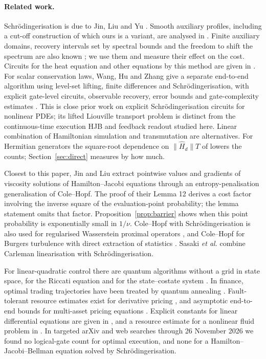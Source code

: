 \documentclass[11pt,a4paper]{article}
\theoremstyle{remark}
\newcommand{\Hd}{\hat H_d}
\begin{document}
\paragraph{Related work.}
Schr\"odingerisation is due to Jin, Liu and Yu \cite{jlyshort,jly}. Smooth
auxiliary profiles, including a cut-off construction of which ours is a
variant, are analysed in \cite{jlm,jlmpy}. Finite auxiliary domains, recovery
intervals set by spectral bounds and the freedom to shift the spectrum are
also known \cite{jlm,gujin,nguyentura}; we use them and measure their effect on
the cost. Circuits for the heat equation and other equations by this method are
given in \cite{hjlz,jlybc}. For scalar conservation laws, Wang, Hu and Zhang
give a separate end-to-end algorithm using level-set lifting, finite
differences and Schr\"odingerisation, with explicit gate-level circuits,
observable recovery, error bounds and gate-complexity estimates
\cite{wang2026conservation}. This is close prior work on explicit
Schr\"odingerisation circuits for nonlinear PDEs; its lifted Liouville
transport problem is distinct from the continuous-time execution HJB and
feedback readout studied here. Linear combination of Hamiltonian simulation
\cite{lchs} and transmutation \cite{jmz} are alternatives. For Hermitian generators the square-root dependence
on $\|\Hd\|T$ of \cite{jmz,gslw,sachdeva} lowers the counts; Section~\ref{sec:direct} measures by how much.

Closest to this paper, Jin and Liu \cite{jinliu} extract pointwise values and
gradients of viscosity solutions of Hamilton--Jacobi equations through an
entropy-penalisation generalisation of Cole--Hopf. The proof of their Lemma 12
derives a cost factor involving the inverse square of the evaluation-point
probability; the lemma statement omits that factor. Proposition~\ref{prop:barrier}
shows when this point probability is exponentially small in $1/\nu$. Cole--Hopf with Schr\"odingerisation is also used for
regularised Wasserstein proximal operators \cite{jlywass}, and Cole--Hopf for
Burgers turbulence with direct extraction of statistics \cite{uchida}. Sasaki
\emph{et al.} \cite{sasaki} combine Carleman linearisation with
Schr\"odingerisation.

For linear-quadratic control there are quantum algorithms without a grid in state
space, for the Riccati equation \cite{krovi,wangriccati} and for the
state--costate system \cite{huanglqr}. In finance, optimal trading trajectories
have been treated by quantum annealing \cite{rosenberg}. Fault-tolerant
resource estimates exist for derivative pricing \cite{chakrabarti,stamatopoulos},
and asymptotic end-to-end bounds for multi-asset pricing equations
\cite{guseynov}. Explicit constants for linear
differential equations are given in \cite{jennings,pocrnic}, and a resource
estimate for a nonlinear fluid problem in \cite{penuel}. In targeted
arXiv and web searches through 26 November 2026 we found no logical-gate
count for optimal execution, and none for a Hamilton--Jacobi--Bellman equation
solved by Schr\"odingerisation.
\end{document}
